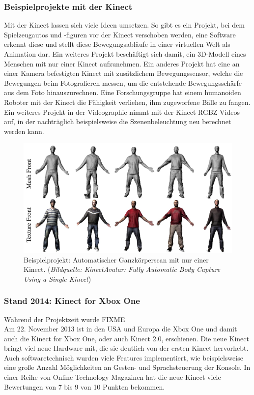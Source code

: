 \documentclass[12pt,a4paper,ngerman]{scrartcl}
\begin{document}
\subsubsection{Beispielprojekte mit der Kinect}

Mit der Kinect lassen sich viele Ideen umsetzen. So gibt es ein Projekt, bei dem Spielzeugautos und
-figuren vor der Kinect verschoben werden, eine Software erkennt diese und stellt diese Bewegungsabläufe
in einer virtuellen Welt als Animation dar.\cite{3dpuppetry} Ein weiteres Projekt beschäftigt sich
damit, ein 3D-Modell eines Menschen mit nur einer Kinect aufzunehmen.\cite{kinectavatar} Ein anderes Projekt hat eine an einer Kamera
befestigten Kinect mit zusätzlichem Bewegungssensor, welche die Bewegungen beim Fotografieren messen, um die
entstehende Bewegungsschärfe aus dem Foto hinauszurechnen.\cite{motiondeblurring} Eine Forschungsgruppe
hat einem humanoiden Roboter mit der Kinect die Fähigkeit verliehen, ihm zugeworfene Bälle zu fangen.\cite{kober}
Ein weiteres Projekt in der Videographie nimmt mit der Kinect RGBZ-Videos auf, in der nachträglich beispielsweise die
Szenenbeleuchtung neu berechnet werden kann.\cite{rgbzvideos}

\begin{figure}[H]
    \centering
    \includegraphics[scale=0.3]{img/kinectavatar.jpg}
    \caption{Beispielprojekt: Automatischer Ganzkörperscan mit nur einer Kinect. ({\em Bildquelle: KinectAvatar: Fully Automatic Body Capture Using a Single Kinect\cite{kinectavatar}})}
\end{figure}

\subsubsection{Stand 2014: Kinect for Xbox One}
Während der Projektzeit wurde {\color{red} FIXME\\}
Am 22. November 2013 ist in den USA und Europa die Xbox One und damit auch die Kinect for Xbox One, oder auch Kinect 2.0, erschienen.\cite{kinect2:wikikinect} Die neue Kinect bringt viel neue Hardware mit, die sie deutlich von der ersten Kinect hervorhebt. Auch softwaretechnisch wurden viele Features implementiert, wie beispielsweise eine große Anzahl Möglichkeiten an Gesten- und Sprachsteuerung der Konsole.\cite{kinect2:gesturevoice} In einer Reihe von Online-Technology-Magazinen hat die neue Kinect viele Bewertungen von 7 bis 9 von 10 Punkten bekommen.\cite{kinect2:wikikinect}
\end{document}
